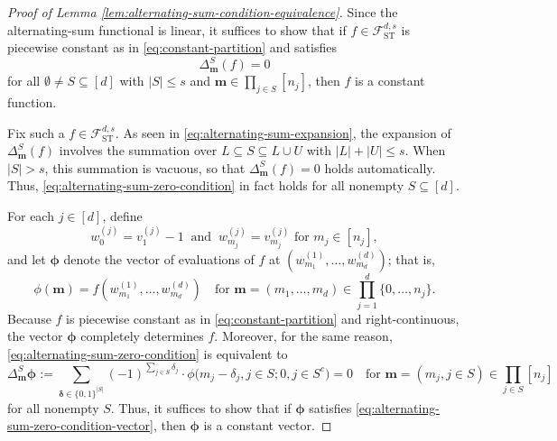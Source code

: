 \documentclass[10pt]{article}
\newcommand{\fst}{{\mathcal{F}^{d, s}_{\text{ST}}}}
\newcommand{\mbf}{{\mathbf{m}}}
\newcommand{\deltabf}{{\boldsymbol{\delta}}}
\newcommand{\phibf}{{\boldsymbol{\phi}}}
\begin{document}
\begin{proof}[Proof of Lemma \ref{lem:alternating-sum-condition-equivalence}]
Since the alternating-sum functional is linear, it suffices to show that
if $f \in \fst$ is piecewise constant as in \eqref{eq:constant-partition} and 
satisfies
\begin{equation}\label{eq:alternating-sum-zero-condition}
    \Delta^S_{\mbf}(f) = 0
\end{equation}
for all $\emptyset \neq S \subseteq [d]$ with $|S| \le s$ and
$\mbf \in \prod_{j \in S} [n_j]$, then $f$ is a constant function.
    
Fix such a $f \in \fst$.
As seen in \eqref{eq:alternating-sum-expansion}, the expansion of 
$\Delta^S_{\mbf}(f)$ involves the summation over 
$L \subseteq S \subseteq L \cup U$ with $|L| + |U| \le s$. When $|S| > s$, this 
summation is vacuous, 
so that $\Delta^S_{\mbf}(f) = 0$ holds automatically. Thus, 
\eqref{eq:alternating-sum-zero-condition} in fact holds for all nonempty
$S \subseteq [d]$.
    
For each $j \in [d]$, define 
\begin{equation*}
    w^{(j)}_0 = v^{(j)}_1 - 1 \ \text{ and } \
    w^{(j)}_{m_j} = v^{(j)}_{m_j} \text{ for } m_j \in [n_j],
\end{equation*}
and let $\phibf$ denote the vector of evaluations of $f$ at 
$(w^{(1)}_{m_1}, \dots, w^{(d)}_{m_d})$; that is,
\begin{equation*}
    \phi(\mbf) = f(w^{(1)}_{m_1}, \dots, w^{(d)}_{m_d})
    \quad \text{for } 
    \mbf = (m_1, \dots, m_d) \in \prod_{j = 1}^d \{0, \dots, n_j\}.
\end{equation*}
Because $f$ is piecewise constant as in \eqref{eq:constant-partition} 
and right-continuous, the vector $\phibf$ completely 
determines $f$. Moreover, for the same reason, 
\eqref{eq:alternating-sum-zero-condition} is equivalent to
\begin{equation}\label{eq:alternating-sum-zero-condition-vector}
    \Delta^S_{\mbf} \phibf 
    := \sum_{\deltabf \in \{0, 1\}^{|S|}} (-1)^{\sum_{j \in S} \delta_j} \cdot 
    \phi\big(m_j - \delta_j, j \in S; 0, j \in S^c\big)
    = 0
    \quad \text{for } 
    \mbf = (m_j, j \in S) \in \prod_{j \in S} [n_j]
\end{equation}
for all nonempty $S$.
Thus, it suffices to show that if $\phibf$ satisfies 
\eqref{eq:alternating-sum-zero-condition-vector},
then $\phibf$ is a constant vector.
    

\end{proof}
\end{document}
